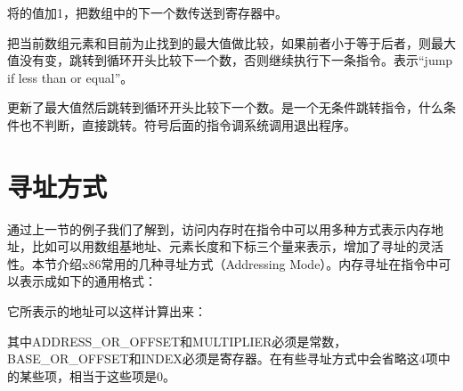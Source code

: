 将的值加1，把数组中的下一个数传送到寄存器中。




把当前数组元素和目前为止找到的最大值做比较，如果前者小于等于后者，则最大值没有变，跳转到循环开头比较下一个数，否则继续执行下一条指令。表示“jump if less than or equal”。




更新了最大值然后跳转到循环开头比较下一个数。是一个无条件跳转指令，什么条件也不判断，直接跳转。符号后面的指令调系统调用退出程序。




\section{寻址方式}
%
通过上一节的例子我们了解到，访问内存时在指令中可以用多种方式表示内存地址，比如可以用数组基地址、元素长度和下标三个量来表示，增加了寻址的灵活性。本节介绍x86常用的几种寻址方式（Addressing Mode）。内存寻址在指令中可以表示成如下的通用格式：


\begin{BookLiteral}
\end{BookLiteral}


它所表示的地址可以这样计算出来：


\begin{BookLiteral}
\end{BookLiteral}


其中ADDRESS\_\BookSplit{}OR\_\BookSplit{}OFFSET和MULTIPLIER必须是常数，BASE\_\BookSplit{}OR\_\BookSplit{}OFFSET和INDEX必须是寄存器。在有些寻址方式中会省略这4项中的某些项，相当于这些项是0。


